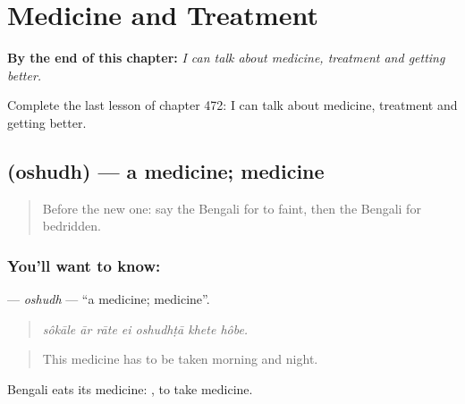 
\chapter{Medicine and Treatment}
\label{ch:bn-medicine-and-treatment}

\begin{chapteropening}
\textbf{By the end of this chapter:} \emph{I can talk about medicine, treatment and getting better.}

Complete the last lesson of chapter 472: I can talk about medicine, treatment and getting better.
\end{chapteropening}

\section[\texorpdfstring{\bn{ওষুধ} (oshudh)}{ওষুধ (oshudh)}]{ (oshudh) — a medicine; medicine}

\label{lesson:BN-C472-oshudh}



\begin{quote}
Before the new one: say the Bengali for to faint, then the Bengali for bedridden.
\end{quote}

\subsection*{You'll want to know: }
\textbf{} — \emph{oshudh} — \textquotedblleft{}a medicine; medicine\textquotedblright{}.

\begin{quote}
      
\end{quote}

\begin{quote}
\emph{sôkāle ār rāte ei oshudhṭā khete hôbe.}
\end{quote}

\begin{quote}
This medicine has to be taken morning and night.
\end{quote}

Bengali eats its medicine:  , to take medicine.

